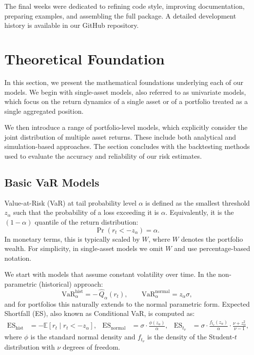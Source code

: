\documentclass{article}
\begin{document}
The final weeks were dedicated to refining code style, improving documentation, preparing examples, and assembling the full package.  
A detailed development history is available in our GitHub repository.


\section{Theoretical Foundation}

In this section, we present the mathematical foundations underlying each of our models. We begin with single-asset models, also referred to as univariate models, which focus on the return dynamics of a single asset or of a portfolio treated as a single aggregated position.

We then introduce a range of portfolio-level models, which explicitly consider the joint distribution of multiple asset returns. These include both analytical and simulation-based approaches. The section concludes with the backtesting methods used to evaluate the accuracy and reliability of our risk estimates.


\subsection{Basic VaR Models}

Value-at-Risk (VaR) at tail probability level $\alpha$ is defined as the smallest threshold $z_{\alpha}$ such that the probability of a loss exceeding it is $\alpha$. Equivalently, it is the $(1 - \alpha)$ quantile of the return distribution:
\[
\Pr\left(r_t < -z_{\alpha}\right) = \alpha.
\]
In monetary terms, this is typically scaled by \( W \), where \( W \) denotes the portfolio wealth. For simplicity, in single-asset models we omit \( W \) and use percentage-based notation.

We start with models that assume constant volatility over time. In the non-parametric (historical) approach:
\[
\mathrm{VaR}_{\alpha}^{\mathrm{hist}} = -\,\widehat{Q}_{\alpha}(r_t), \qquad
\mathrm{VaR}_{\alpha}^{\mathrm{normal}} = z_{\alpha} \sigma,
\]
and for portfolios this naturally extends to the normal parametric form. Expected Shortfall (ES), also known as Conditional VaR, is computed as:
\[
\begin{aligned}
\mathrm{ES}_{\mathrm{hist}} &= -\mathbb{E}\left[r_t \mid r_t < -z_{\alpha}\right], &
\mathrm{ES}_{\mathrm{normal}} &= \sigma \cdot \frac{\phi(z_{\alpha})}{\alpha}, &
\mathrm{ES}_{t_\nu} &= \sigma \cdot \frac{f_{t_\nu}(z_{\alpha})}{\alpha} \cdot \frac{\nu + z_{\alpha}^2}{\nu - 1},
\end{aligned}
\]
where $\phi$ is the standard normal density and $f_{t_\nu}$ is the density of the Student-$t$ distribution with $\nu$ degrees of freedom.
\end{document}
